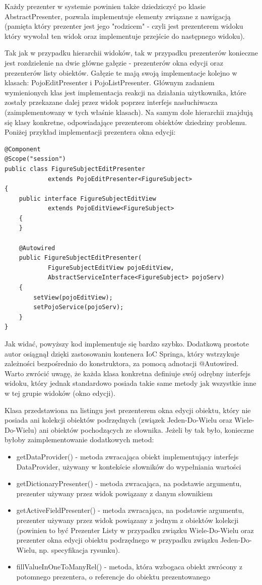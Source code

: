 \newpage
Każdy prezenter w systemie powinien także dziedziczyć po klasie AbstractPresenter, pozwala implementuje elementy związane z nawigacją (pamięta który prezenter jest jego "rodzicem" - czyli jest prezenterem widoku który wywołał ten widok oraz implementuje przejście do następnego widoku).

Tak jak w przypadku hierarchii widoków, tak w przypadku prezenterów konieczne jest rozdzielenie na dwie główne gałęzie - prezenterów okna edycji oraz prezenterów listy obiektów. Gałęzie te mają swoją implementacje kolejno w klasach: PojoEditPresenter i PojoListPresenter. Głównym zadaniem wymienionych klas jest implementacja reakcji na działania użytkownika, które zostały przekazane dalej przez widok poprzez interfejs nasłuchiwacza (zaimplementowany w tych właśnie klasach). Na samym dole hierarchii znajdują się klasy konkretne, odpowiadające prezenterom obiektów dziedziny problemu. Poniżej przykład implementacji prezentera okna edycji:
\begin{lstlisting}
@Component
@Scope("session")
public class FigureSubjectEditPresenter 
			extends PojoEditPresenter<FigureSubject>
{
	public interface FigureSubjectEditView 
			extends PojoEditView<FigureSubject>
	{
	}

	@Autowired
	public FigureSubjectEditPresenter(
			FigureSubjectEditView pojoEditView, 
			AbstractServiceInterface<FigureSubject> pojoServ)
	{
		setView(pojoEditView);
		setPojoService(pojoServ);
	}
}
\end{lstlisting}

Jak widać, powyższy kod implementuje się bardzo szybko. Dodatkową prostote autor osiągnął dzięki zastosowaniu kontenera IoC Springa, który wstrzykuje zależności bezpośrednio do konstruktora, za pomocą adnotacji @Autowired. Warto zwrócić uwagę, że każda klasa konkretna definiuje swój odrębny interfejs widoku, który jednak standardowo posiada takie same metody jak wszystkie inne w tej grupie widoków (okno edycji).

\newpage
Klasa przedstawiona na listingu jest prezenterem okna edycji obiektu, który nie posiada ani kolekcji obiektów podrzędnych (związek Jeden-Do-Wielu oraz Wiele-Do-Wielu) ani obiektów pochodzących ze słownika. Jeżeli by tak było, konieczne byłoby zaimplementowanie dodatkowych metod:
\begin{itemize}
\item getDataProvider() - metoda zwracająca obiekt implementujący interfejs DataProvider, używany w kontekście słowników do wypełniania wartości
\item getDictionaryPresenter() - metoda zwracająca, na podstawie argumentu, prezenter używany przez widok powiązany z danym słownikiem
\item getActiveFieldPresenter() - metoda zwracająca, na podstawie argumentu, prezenter używany przez widok powiązany z jednym z obiektów kolekcji (powinien to być Prezenter Listy w przypadku związku Wiele-Do-Wielu oraz prezenter okna edycji obiektu podrzędnego w przypadku związku Jeden-Do-Wielu, np. specyfikacja rysunku).
\item fillValueInOneToManyRel() - metoda, która wzbogaca obiekt zwrócony z potomnego prezentera, o referencje do obiektu prezentowanego
\end{itemize}

